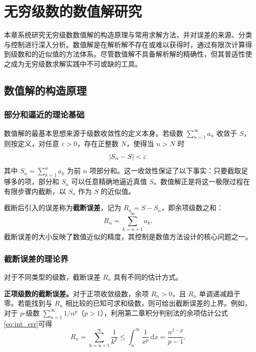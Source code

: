 
\chapter{无穷级数的数值解研究}

本章系统研究无穷级数数值解的构造原理与常用求解方法，并对误差的来源、分类与控制进行深入分析。数值解是在解析解不存在或难以获得时，通过有限次计算得到级数和的近似值的方法体系。尽管数值解不具备解析解的精确性，但其普适性使之成为无穷级数求解实践中不可或缺的工具。

\section{数值解的构造原理}

\subsection{部分和逼近的理论基础}

数值解的最基本思想来源于级数收敛性的定义本身。若级数 $\displaystyle \sum_{n=1}^{\infty} a_n$ 收敛于 $S$，则按定义，对任意 $\varepsilon > 0$，存在正整数 $N$，使得当 $n > N$ 时
\begin{equation}
\left|S_n - S\right| < \varepsilon
\end{equation}
其中 $\displaystyle S_n = \sum_{k=1}^{n} a_k$ 为前 $n$ 项部分和。这一收敛性保证了以下事实：只要截取足够多的项，部分和 $S_n$ 可以任意精确地逼近真值 $S$。数值解正是将这一极限过程在有限步骤内截断，以 $S_n$ 作为 $S$ 的近似值。

截断后引入的误差称为\textbf{截断误差}，记为 $R_n = S - S_n$，即余项级数之和：
\begin{equation}
R_n = \sum_{k=n+1}^{\infty} a_k.
\end{equation}
截断误差的大小反映了数值近似的精度，其控制是数值方法设计的核心问题之一。

\subsection{截断误差的理论界}

对于不同类型的级数，截断误差 $R_n$ 具有不同的估计方式。

\textbf{正项级数的截断误差。}对于正项收敛级数，余项 $R_n > 0$，且 $R_n$ 单调递减趋于零。若能找到与 $R_n$ 相比较的已知可求和级数，则可给出截断误差的上界。例如，对于 $p$-级数 $\displaystyle \sum_{n=1}^{\infty} 1/n^p$（$p > 1$），利用第二章积分判别法的余项估计公式\eqref{eq:int_err}可得
\begin{equation}
R_n = \sum_{k=n+1}^{\infty} \frac{1}{k^p} \leq \int_n^{\infty} \frac{1}{x^p}\, \mathrm{d}x = \frac{n^{1-p}}{p-1}.
\end{equation}

